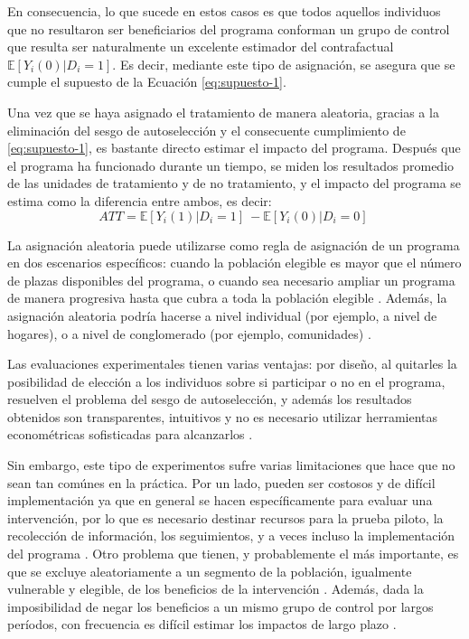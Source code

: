 \documentclass[../../main.tex]{subfiles}
\begin{document}
En consecuencia, lo que sucede en estos casos es que todos aquellos individuos que no
resultaron ser beneficiarios del programa conforman un grupo de control que resulta ser
naturalmente un excelente estimador del contrafactual \(\mathbb{E}
\left[Y_i(0)|D_i=1\right]\). Es decir, mediante este tipo de asignación, se asegura que se
cumple el supuesto de la Ecuación \ref{eq:supuesto-1}.

Una vez que se haya asignado el tratamiento de manera aleatoria, gracias a la eliminación
del sesgo de autoselección y el consecuente cumplimiento de \ref{eq:supuesto-1}, es
bastante directo estimar el impacto del programa. Después que el programa ha funcionado
durante un tiempo, se miden los resultados promedio de las unidades de tratamiento y de no
tratamiento, y el impacto del programa se estima como la diferencia entre ambos, es decir:
\[
    ATT = \mathbb{E} \left[Y_i(1)|D_i=1\right]\ - \mathbb{E} \left[Y_i(0)|D_i=0\right]\
\]

La asignación aleatoria puede utilizarse como regla de asignación de un programa en dos
escenarios específicos: cuando la población elegible es mayor que el número de plazas
disponibles del programa, o  cuando sea necesario ampliar un programa de manera progresiva
hasta que cubra a toda la población elegible \cite{gertler-2016}. Además, la asignación
aleatoria podría hacerse a nivel individual (por ejemplo, a nivel de hogares), o a nivel
de conglomerado (por ejemplo, comunidades) \cite{bernal}.

Las evaluaciones experimentales tienen varias ventajas: por diseño, al quitarles la
posibilidad de elección a los individuos sobre si participar o no en el programa,
resuelven el problema del sesgo de autoselección, y además los resultados obtenidos son
transparentes, intuitivos y no es necesario utilizar herramientas econométricas
sofisticadas para alcanzarlos \cite{bernal}.

Sin embargo, este tipo de experimentos sufre varias limitaciones que hace que no sean tan
comúnes en la práctica. Por un lado, pueden ser costosos y de difícil implementación ya
que en general se hacen específicamente para evaluar una intervención, por lo que es
necesario destinar recursos para la prueba piloto, la recolección de información, los
seguimientos, y a veces incluso la implementación del programa \cite{bernal}. Otro
problema que tienen, y probablemente el más importante, es que se excluye aleatoriamente a
un segmento de la población, igualmente vulnerable y elegible, de los beneficios de la
intervención \cite{bernal}. Además, dada la imposibilidad de negar los beneficios a un
mismo grupo de control por largos períodos, con frecuencia es difícil estimar los impactos
de largo plazo \cite{bernal}.
\end{document}

